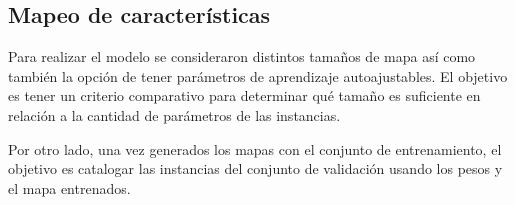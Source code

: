 \documentclass[informe.tex]{subfiles}
\begin{document}
      
     \newpage 
    \subsection{Mapeo de características}
      Para realizar el modelo se consideraron distintos tamaños de mapa así como también la opción de tener parámetros de aprendizaje autoajustables. El objetivo es tener un criterio comparativo para determinar qué tamaño es suficiente en relación a la cantidad de parámetros de las instancias.
      
      Por otro lado, una vez generados los mapas con el conjunto de entrenamiento, el objetivo es catalogar las instancias del conjunto de validación usando los pesos y el mapa entrenados. 
      
\end{document}
